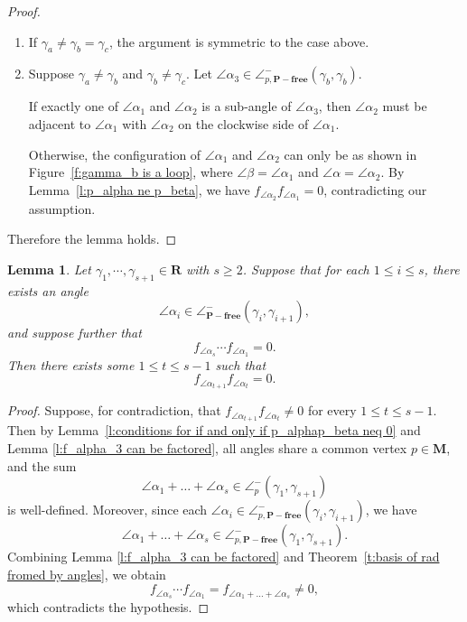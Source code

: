 \documentclass[a4paper,10pt]{amsart}
\theoremstyle{plain}          %
\newtheorem{lemma}[theorem]{Lemma}
\theoremstyle{definition}
\def\MM{\mathbf{M}}
\def\MM{\mathbf{M}}
\newcommand{\apfree}{\angle^-_{\mathbf{P-free}}}
\newcommand{\appfree}{\angle^-_{p,\mathbf{P-free}}}
\newcommand{\ha}{\angle^-}
\begin{document}
\begin{proof}
\begin{enumerate}
        \textbf{Case 2b:} $\angle\alpha_1$ is not a sub-angle of $\angle\alpha_2$. Then $\angle\alpha_2$ must be adjacent to $\angle\alpha_1$ with $\angle\alpha_2$ on the clockwise side of $\angle\alpha_1$, as desired.


\item If $\gamma_a\neq \gamma_b= \gamma_c$, the argument is symmetric to the case above.

 \item Suppose $\gamma_a\neq \gamma_b$ and $\gamma_b\neq \gamma_c$. Let $\angle\alpha_3\in \ha_{p, \mathbf{P}-\mathbf{free}}(\gamma_b,\gamma_b)$. 
        
        If exactly one of $\angle\alpha_1$ and $\angle\alpha_2$ is a sub-angle of $\angle\alpha_3$, then $\angle\alpha_2$ must be adjacent to $\angle\alpha_1$ with $\angle\alpha_2$ on the clockwise side of $\angle\alpha_1$.
        
        Otherwise, the configuration of $\angle\alpha_1$ and $\angle\alpha_2$ can only be as shown in Figure~\ref{f:gamma_b is a loop}, where $\angle\beta=\angle\alpha_1$ and $\angle\alpha=\angle\alpha_2$. By Lemma~\ref{l:p_alpha ne p_beta}, we have $f_{\angle\alpha_2} f_{\angle\alpha_1}=0$, contradicting our assumption.
\end{enumerate}
   Therefore the lemma holds.
\end{proof}


\begin{lemma}\label{l:fp=0=>fafb=0}
Let $\gamma_1,\cdots,\gamma_{s+1}\in\mathbf{R}$ with $s\ge 2$.
  Suppose that for each $1\leq i\leq s$, there exists an angle $$\angle\alpha_i\in\apfree(\gamma_i,\gamma_{i+1}),$$ and suppose further that $$f_{\angle\alpha_s}\cdots f_{\angle\alpha_1}=0.$$ Then there exists some $1\leq t\leq s-1$ such that $$f_{\angle\alpha_{t+1}}f_{\angle\alpha_t}=0.$$
\end{lemma}
\begin{proof} Suppose, for contradiction, that $f_{\angle\alpha_{t+1}}f_{\angle\alpha_t}\ne0$ for every $1\le t\le s-1$. Then by Lemma~\ref{l:conditions for if and only if p_alphap_beta neq 0} and Lemma \ref{l:f_alpha_3 can be factored}, all angles  share a common vertex $p\in\MM$, and the sum $$\angle\alpha_1+\dots+\angle\alpha_s\in\angle^{-}_p(\gamma_1,\gamma_{s+1})$$ is well-defined. Moreover, since each $\angle\alpha_i\in\appfree(\gamma_i,\gamma_{i+1})$, we have $$\angle\alpha_1+\dots+\angle\alpha_s\in\appfree(\gamma_1,\gamma_{s+1}).$$ Combining  Lemma \ref{l:f_alpha_3 can be factored} and Theorem~\ref{t:basis of rad fromed by angles}, we obtain \[f_{\angle\alpha_s}\cdots f_{\angle\alpha_1}=f_{\angle\alpha_1+\dots+\angle\alpha_s}\ne0,\]
which contradicts the hypothesis.
\end{proof}
\end{document}
